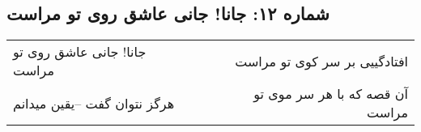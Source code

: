 \begin{center}
\section*{شماره ۱۲: جانا! جانی عاشق روی تو مراست}
\label{sec:012}
\begin{longtable}{l p{0.5cm} r}
جانا! جانی عاشق روی تو مراست
&&
افتادگییی بر سر کوی تو مراست
\\
هرگز نتوان گفت –یقین میدانم
&&
آن قصه که با هر سر موی تو مراست
\\
\end{longtable}
\end{center}
